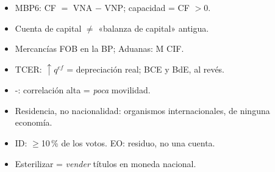 \documentclass{article}
\begin{document}
\begin{columnas}
\begin{trampa}
\begin{itemize}
\item MBP6: CF $=$ VNA $-$ VNP; capacidad = CF $>0$.
\item Cuenta de capital $\neq$ «balanza de capital» antigua.
\item Mercancías FOB en la BP; Aduanas: M CIF.
\item TCER: $\uparrow q^{ef}$ = depreciación real; BCE y BdE, al revés.
\item {}-: correlación alta = \emph{poca} movilidad.
\item Residencia, no nacionalidad: organismos internacionales, de ninguna economía.
\item ID: $\geq$10\,\% de los votos. EO: residuo, no una cuenta.
\item Esterilizar = \emph{vender} títulos en moneda nacional.
\end{itemize}
\end{trampa}

\end{columnas}
\end{document}
